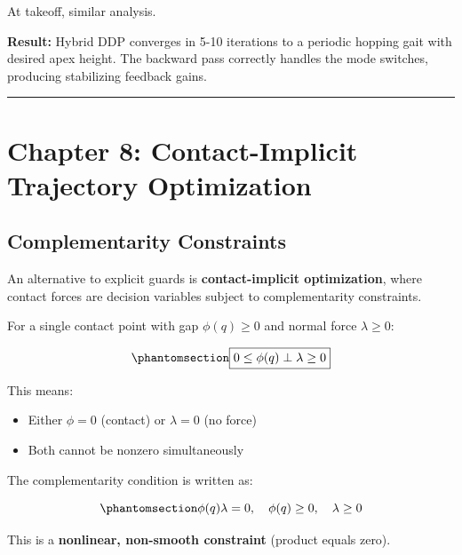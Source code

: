 \documentclass[
  letterpaper,
  DIV=11,
  numbers=noendperiod]{scrartcl}
\providecommand{\tightlist}{%
  \setlength{\itemsep}{0pt}\setlength{\parskip}{0pt}}\usepackage{longtable,booktabs,array}
\begin{document}
At takeoff, similar analysis.

\textbf{Result:} Hybrid DDP converges in 5-10 iterations to a periodic
hopping gait with desired apex height. The backward pass correctly
handles the mode switches, producing stabilizing feedback gains.

\begin{center}\rule{0.5\linewidth}{0.5pt}\end{center}

\section{Chapter 8: Contact-Implicit Trajectory
Optimization}\label{sec-contact-implicit}

\subsection{Complementarity
Constraints}\label{complementarity-constraints}

An alternative to explicit guards is \textbf{contact-implicit
optimization}, where contact forces are decision variables subject to
complementarity constraints.

\begin{tcolorbox}[enhanced jigsaw, coltitle=black, titlerule=0mm, toprule=.15mm, opacitybacktitle=0.6, left=2mm, opacityback=0, rightrule=.15mm, leftrule=.75mm, breakable, colframe=quarto-callout-tip-color-frame, bottomtitle=1mm, toptitle=1mm, arc=.35mm, title=\textcolor{quarto-callout-tip-color}{\faLightbulb}\hspace{0.5em}{Complementarity Formulation}, bottomrule=.15mm, colback=white, colbacktitle=quarto-callout-tip-color!10!white]

For a single contact point with gap \(\phi(q) \geq 0\) and normal force
\(\lambda \geq 0\):

\begin{equation}\phantomsection\label{eq-complementarity}{
\boxed{0 \leq \phi(q) \perp \lambda \geq 0}
}\end{equation}

This means:

\begin{itemize}
\tightlist
\item
  Either \(\phi = 0\) (contact) or \(\lambda = 0\) (no force)
\item
  Both cannot be nonzero simultaneously
\end{itemize}

The complementarity condition is written as:

\begin{equation}\phantomsection\label{eq-complementarity-kkt}{
\phi(q) \lambda = 0, \quad \phi(q) \geq 0, \quad \lambda \geq 0
}\end{equation}

This is a \textbf{nonlinear, non-smooth constraint} (product equals
zero).

\end{tcolorbox}
\end{document}
